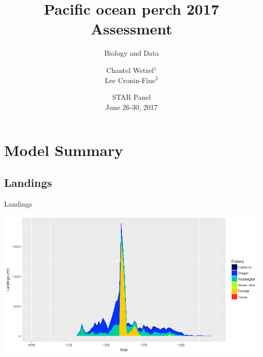 \documentclass[pdf]{beamer}\usepackage[]{graphicx}\usepackage[]{color}
\title{Pacific ocean perch 2017 Assessment}
\subtitle{Biology and Data}
\author{Chantel Wetzel$^{1}$\\
        Lee Cronin-Fine$^{2}$}
\institute[NWFSC]{
Northwest Fisheries Science Center$^1$ \\
University of Washington$^2$ \\
\medskip
}
\date{{\footnotesize STAR Panel \\ June 26-30, 2017}}
\begin{document}
\begin{frame}
  \titlepage
\end{frame}


\section{Model Summary}
\subsection{Landings}
\begin{frame}{Landings}
  \begin{center}
    \includegraphics[scale = 0.40]{figures/catches.png}
  \end{center}
\end{frame}
\end{document}
